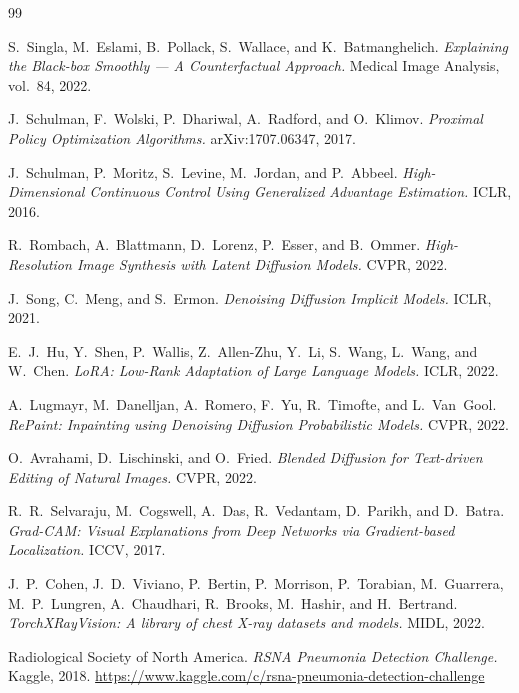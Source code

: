 \documentclass[11pt,a4paper,oneside]{report}
\begin{document}

\begin{thebibliography}{99}

S.~Singla, M.~Eslami, B.~Pollack, S.~Wallace, and K.~Batmanghelich.
\textit{Explaining the Black-box Smoothly --- A Counterfactual Approach.}
Medical Image Analysis, vol.~84, 2022.

J.~Schulman, F.~Wolski, P.~Dhariwal, A.~Radford, and O.~Klimov.
\textit{Proximal Policy Optimization Algorithms.}
arXiv:1707.06347, 2017.

J.~Schulman, P.~Moritz, S.~Levine, M.~Jordan, and P.~Abbeel.
\textit{High-Dimensional Continuous Control Using Generalized Advantage
Estimation.} ICLR, 2016.

R.~Rombach, A.~Blattmann, D.~Lorenz, P.~Esser, and B.~Ommer.
\textit{High-Resolution Image Synthesis with Latent Diffusion Models.}
CVPR, 2022.

J.~Song, C.~Meng, and S.~Ermon.
\textit{Denoising Diffusion Implicit Models.} ICLR, 2021.

E.~J.~Hu, Y.~Shen, P.~Wallis, Z.~Allen-Zhu, Y.~Li, S.~Wang, L.~Wang, and
W.~Chen.
\textit{LoRA: Low-Rank Adaptation of Large Language Models.} ICLR, 2022.

A.~Lugmayr, M.~Danelljan, A.~Romero, F.~Yu, R.~Timofte, and L.~Van~Gool.
\textit{RePaint: Inpainting using Denoising Diffusion Probabilistic Models.}
CVPR, 2022.

O.~Avrahami, D.~Lischinski, and O.~Fried.
\textit{Blended Diffusion for Text-driven Editing of Natural Images.}
CVPR, 2022.

R.~R.~Selvaraju, M.~Cogswell, A.~Das, R.~Vedantam, D.~Parikh, and D.~Batra.
\textit{Grad-CAM: Visual Explanations from Deep Networks via
Gradient-based Localization.} ICCV, 2017.

J.~P.~Cohen, J.~D.~Viviano, P.~Bertin, P.~Morrison, P.~Torabian,
M.~Guarrera, M.~P.~Lungren, A.~Chaudhari, R.~Brooks, M.~Hashir, and
H.~Bertrand.
\textit{TorchXRayVision: A library of chest X-ray datasets and models.}
MIDL, 2022.

Radiological Society of North America.
\textit{RSNA Pneumonia Detection Challenge.} Kaggle, 2018.
\url{https://www.kaggle.com/c/rsna-pneumonia-detection-challenge}


\end{thebibliography}
\end{document}
